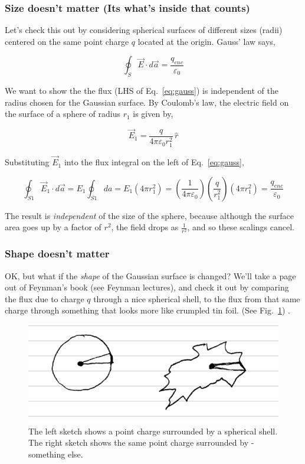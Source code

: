 \documentclass[12pt]{article}
\begin{document}
\begin{flushleft}
\subsubsection*{\bf Size doesn't matter (Its what's inside that counts)}

Let's check this out by considering spherical surfaces of different sizes (radii) centered on the same point charge $q$ located at the origin.  Gauss' law says,

\begin{equation}
\oint_{S} \vec{E} \cdot d\vec{a} = \frac{q_{enc}}{\varepsilon_{0}}
\label{eq:gauss}
\end{equation}

We want to show the the flux (LHS of Eq.~\ref{eq:gauss}) is independent of the radius chosen for the Gaussian surface. By Coulomb's law, the electric field on the surface of a sphere of radius $r_{1}$ is given by,

\[
\vec{E}_{1} = \frac{ q }{ 4 \pi \varepsilon_{0} r_{1}^{2} } \, \hat{r}
\]

Substituting $\vec{E}_{1}$ into the flux integral on the left of Eq.~\ref{eq:gauss},

\[
\oint_{S1} \vec{E}_{1} \cdot d\vec{a} = E_{1} \oint_{S1} da = E_{1}(4\pi r_{1}^{2})=\left( \frac{1}{4\pi \varepsilon_{0}}\right) \left( \frac{ q }{r_{1}^{2} } \right)(4\pi r_{1}^{2}) = \frac{q_{enc}}{\varepsilon_{0}}
\]

The result is {\it independent} of the size of the sphere, because although the surface area goes up by a factor of $r^{2}$, the field drops as $\frac{1}{r^{2}}$, and so these scalings cancel.

\subsubsection*{\bf Shape doesn't matter}

OK, but what if the {\it shape} of the Gaussian surface is changed?  We'll take a page out of Feynman's book  (see Feynman lectures), and check it out by comparing the flux due to charge $q$ through a nice spherical shell, to the flux from that same charge through something that looks more like crumpled tin foil.   (See Fig.~\ref{fig:crush})
.
\begin{figure}[h]
\centering
\includegraphics*[trim=0cm 0cm 1cm 0cm, clip=true, width=0.5\columnwidth]{crunch_sphere.png}
\caption{The left sketch shows a point charge surrounded by a spherical shell.  The right sketch shows the same  point charge surrounded by - something else.}
\label{fig:crush}
\end{figure}


\end{flushleft}
\end{document}
